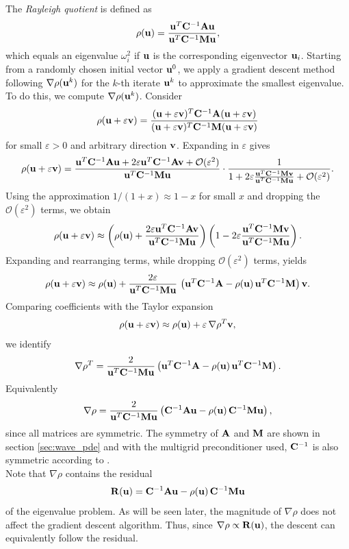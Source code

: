 The \textit{Rayleigh quotient} is defined as
\[
\rho(\mathbf{u}) = \frac{\mathbf{u}^T \mathbf{C}^{-1}\mathbf{A} \mathbf{u}}{\mathbf{u}^T \mathbf{C}^{-1}\mathbf{M} \mathbf{u}},
\]
which equals an eigenvalue $\omega_i^2$ if $\mathbf{u}$ is the corresponding eigenvector $\mathbf{u}_i$. Starting from a randomly chosen initial vector $\mathbf{u}^0$, we apply a gradient descent method following $\nabla \rho(\mathbf{u}^k)$ for the $k$-th iterate $\mathbf{u}^k$ to approximate the smallest eigenvalue. To do this, we compute $\nabla \rho(\mathbf{u}^k)$. Consider
\[
\rho(\mathbf{u} + \varepsilon \mathbf{v}) =
\frac{(\mathbf{u} + \varepsilon \mathbf{v})^T \mathbf{C}^{-1}\mathbf{A} (\mathbf{u} + \varepsilon \mathbf{v})}{(\mathbf{u} + \varepsilon \mathbf{v})^T \mathbf{C}^{-1}\mathbf{M} (\mathbf{u} + \varepsilon \mathbf{v})}
\]
for small $\varepsilon>0$ and arbitrary direction $\mathbf{v}$. Expanding in $\varepsilon$ gives
\[
\rho(\mathbf{u} + \varepsilon \mathbf{v}) =
\frac{\mathbf{u}^T \mathbf{C}^{-1}\mathbf{A} \mathbf{u} + 2\varepsilon \mathbf{u}^T \mathbf{C}^{-1}\mathbf{A} \mathbf{v} + \mathcal{O}(\varepsilon^2)}{\mathbf{u}^T \mathbf{C}^{-1}\mathbf{M} \mathbf{u}}\cdot
\frac{1}{1 + 2\varepsilon \frac{\mathbf{u}^T \mathbf{C}^{-1}\mathbf{M} \mathbf{v}}{\mathbf{u}^T \mathbf{C}^{-1}\mathbf{M} \mathbf{u}} + \mathcal{O}(\varepsilon^2)}.
\]
Using the approximation $1/(1+x) \approx 1-x$ for small $x$ and dropping the $\mathcal{O}(\varepsilon^2)$ terms, we obtain
\[
\rho(\mathbf{u} + \varepsilon \mathbf{v}) \approx
\left(\rho(\mathbf{u}) + \frac{2\varepsilon \mathbf{u}^T \mathbf{C}^{-1}\mathbf{A} \mathbf{v}}{\mathbf{u}^T \mathbf{C}^{-1}\mathbf{M} \mathbf{u}}\right)
\left(1 - 2\varepsilon \frac{\mathbf{u}^T \mathbf{C}^{-1}\mathbf{M} \mathbf{v}}{\mathbf{u}^T \mathbf{C}^{-1}\mathbf{M} \mathbf{u}}\right).
\]
Expanding and rearranging terms, while dropping $\mathcal{O}(\varepsilon^2)$ terms, yields
\[
\rho(\mathbf{u} + \varepsilon \mathbf{v}) \approx
\rho(\mathbf{u}) + \frac{2\varepsilon}{\mathbf{u}^T \mathbf{C}^{-1}\mathbf{M} \mathbf{u}}\,
\left(\mathbf{u}^T \mathbf{C}^{-1}\mathbf{A} - \rho(\mathbf{u})\, \mathbf{u}^T \mathbf{C}^{-1}\mathbf{M}\right)\mathbf{v}.
\]
Comparing coefficients with the Taylor expansion
\[
\rho(\mathbf{u} + \varepsilon \mathbf{v}) \approx \rho(\mathbf{u}) + \varepsilon\, \nabla \rho^T \mathbf{v},
\]
we identify
\[
\nabla \rho^T = \frac{2}{\mathbf{u}^T \mathbf{C}^{-1}\mathbf{M} \mathbf{u}}
\left(\mathbf{u}^T \mathbf{C}^{-1}\mathbf{A} - \rho(\mathbf{u})\, \mathbf{u}^T \mathbf{C}^{-1}\mathbf{M}\right).
\]
Equivalently
\[
\nabla \rho = \frac{2}{\mathbf{u}^T \mathbf{C}^{-1}\mathbf{M} \mathbf{u}}
\left(\mathbf{C}^{-1}\mathbf{A} \mathbf{u} - \rho(\mathbf{u})\, \mathbf{C}^{-1}\mathbf{M} \mathbf{u}\right),
\]
since all matrices are symmetric. The symmetry of $\mathbf{A}$ and $\mathbf{M}$ are shown in section \ref{sec:wave_pde} and with the multigrid preconditioner used, $\mathbf{C}^{-1}$ is also symmetric according to \cite{NGSolveMG}.\\ 
Note that $\nabla \rho$ contains the residual
\[
\mathbf{R}(\mathbf{u}) = \mathbf{C}^{-1}\mathbf{A} \mathbf{u} - \rho(\mathbf{u})\, \mathbf{C}^{-1}\mathbf{M} \mathbf{u}
\]
of the eigenvalue problem. As will be seen later, the magnitude of $\nabla \rho$ does not affect the gradient descent algorithm. Thus, since $\nabla \rho \propto \mathbf{R}(\mathbf{u})$, the descent can equivalently follow the residual.\\

